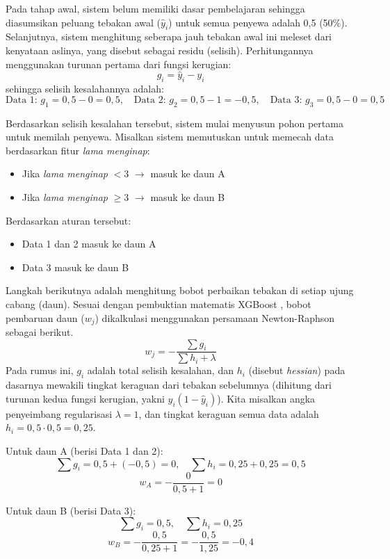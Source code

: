     Pada tahap awal, sistem belum memiliki dasar pembelajaran sehingga diasumsikan peluang tebakan awal ($\hat{y}_i$) untuk semua penyewa adalah 0,5 (50\%). Selanjutnya, sistem menghitung seberapa jauh tebakan awal ini meleset dari kenyataan aslinya, yang disebut sebagai residu (selisih). Perhitungannya menggunakan turunan pertama dari fungsi kerugian:
    $$
    g_i = \hat{y}_i - y_i
    $$ 
    sehingga selisih kesalahannya adalah: 
    $$
    \text{Data 1: } g_1 = 0{,}5 - 0 = 0{,}5,\quad 
    \text{Data 2: } g_2 = 0{,}5 - 1 = -0{,}5,\quad 
    \text{Data 3: } g_3 = 0{,}5 - 0 = 0{,}5
    $$
    
    Berdasarkan selisih kesalahan tersebut, sistem mulai menyusun pohon pertama untuk memilah penyewa. Misalkan sistem memutuskan untuk memecah data berdasarkan fitur \textit{lama menginap}:
    \begin{itemize}
      \item Jika \textit{lama menginap} $< 3$ $\rightarrow$ masuk ke daun A
      \item Jika \textit{lama menginap} $\geq 3$ $\rightarrow$ masuk ke daun B
    \end{itemize}
    
    Berdasarkan aturan tersebut:
    \begin{itemize}
      \item Data 1 dan 2 masuk ke daun A
      \item Data 3 masuk ke daun B
    \end{itemize}
    
    Langkah berikutnya adalah menghitung bobot perbaikan tebakan di setiap ujung cabang (daun). Sesuai dengan pembuktian matematis XGBoost \cite{chen2016xgboost}, bobot pembaruan daun ($w_j$) dikalkulasi menggunakan persamaan Newton-Raphson sebagai berikut.
    $$
    w_j = -\frac{\sum g_i}{\sum h_i + \lambda}
    $$
    Pada rumus ini, $g_i$ adalah total selisih kesalahan, dan $h_i$ (disebut {\it hessian}) pada dasarnya mewakili tingkat keraguan dari tebakan sebelumnya (dihitung dari turunan kedua fungsi kerugian, yakni $\hat{y}_i (1 - \hat{y}_i)$). Kita misalkan angka penyeimbang regularisasi $\lambda = 1$, dan tingkat keraguan semua data adalah $h_i = 0{,}5 \cdot 0{,}5 = 0{,}25$.
    
    Untuk daun A (berisi Data 1 dan 2):
    $$
    \sum g_i = 0{,}5 + (-0{,}5) = 0,\quad
    \sum h_i = 0{,}25 + 0{,}25 = 0{,}5
    $$
    $$
    w_A = -\frac{0}{0{,}5 + 1} = 0
    $$
    
    Untuk daun B (berisi Data 3):
    $$
    \sum g_i = 0{,}5,\quad
    \sum h_i = 0{,}25
    $$
    $$
    w_B = -\frac{0{,}5}{0{,}25 + 1} = -\frac{0{,}5}{1{,}25} = -0{,}4
    $$
    
